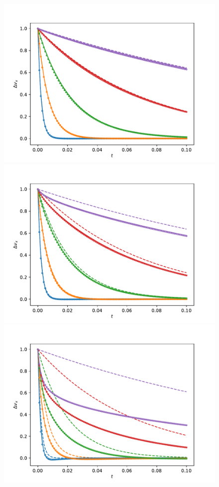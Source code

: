 \documentclass[fleqn,usenatbib]{mnras}
\begin{document}
\begin{figure}
    \begin{center}
      \includegraphics[width=\columnwidth]{figs/delta_vx_Epstein-f=0_01.pdf}
      \includegraphics[width=\columnwidth]{figs/delta_vx_Epstein-f=0_1.pdf}
      \includegraphics[width=\columnwidth]{figs/delta_vx_Epstein-f=1_0.pdf}

\end{center}
\end{figure}
\end{document}
